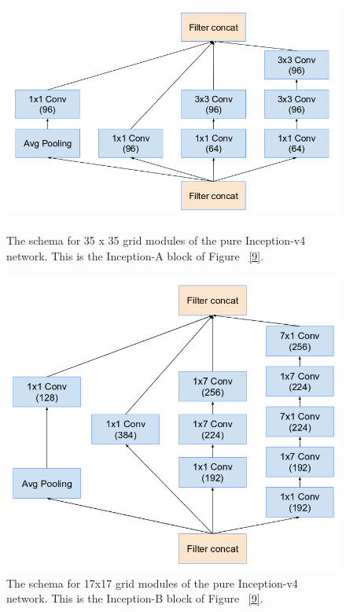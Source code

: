 \documentclass[a4paper,12pt, twoside]{NITKReport}
\begin{document}
\begin{figure}[h]
\centering

    \includegraphics[height=8cm,width=15cm]{figure4.png}
    \caption{The  schema  for 35 x 35 grid  modules of the pure Inception-v4 network. This is the Inception-A block of Figure ~\ref{9}.~\cite{szegedy2017inception}}
    \label{4}
  
\end{figure}



\begin{figure}[h]
  \centering
  
    \includegraphics[height=10cm,width=15cm]{figure5.png}
    \caption{The  schema  for 17x17 grid  modules  of  the  pure Inception-v4 network. This is the Inception-B block of Figure ~\ref{9}.~\cite{szegedy2017inception}}
    \label{5}
 
 \end{figure}
 
\end{document}
